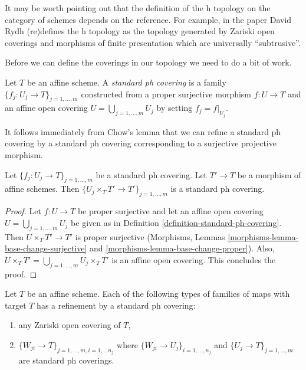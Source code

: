 \medskip\noindent
It may be worth pointing out that the definition of the h topology
on the category of schemes depends on the reference.
For example, in the paper \cite{rydh_descent} David Rydh (re)defines the
h topology as the topology generated by Zariski open coverings
and morphisms of finite presentation which are universally ``subtrusive''.

\medskip\noindent
Before we can define the coverings in our topology we need to do
a bit of work.

\begin{definition}
\label{definition-standard-ph-covering}
Let $T$ be an affine scheme. A {\it standard ph covering} is a family
$\{f_j : U_j \to T\}_{j = 1, \ldots, m}$ constructed from a
proper surjective morphism $f : U \to T$ and an affine open covering
$U = \bigcup_{j = 1, \ldots, m} U_j$ by setting $f_j = f|_{U_j}$.
\end{definition}

\noindent
It follows immediately from Chow's lemma that we can refine a
standard ph covering by a standard ph covering corresponding to
a surjective projective morphism.

\begin{lemma}
\label{lemma-base-change-standard-ph}
Let $\{f_j : U_j \to T\}_{j = 1, \ldots, m}$ be a standard ph covering.
Let $T' \to T$ be a morphism of affine schemes.
Then $\{U_j \times_T T' \to T'\}_{j = 1, \ldots, m}$ is a
standard ph covering.
\end{lemma}

\begin{proof}
Let $f : U \to T$ be proper surjective and let an affine open covering
$U = \bigcup_{j = 1, \ldots, m} U_j$ be given as in
Definition \ref{definition-standard-ph-covering}.
Then $U \times_T T' \to T'$ is proper surjective
(Morphisms, Lemmas \ref{morphisms-lemma-base-change-surjective} and
\ref{morphisms-lemma-base-change-proper}).
Also, $U \times_T T' = \bigcup_{j = 1, \ldots, m} U_j \times_T T'$
is an affine open covering.
This concludes the proof.
\end{proof}

\begin{lemma}
\label{lemma-refine-by-standard-ph}
Let $T$ be an affine scheme. Each of the following types of families
of maps with target $T$ has a refinement by a standard ph covering:
\begin{enumerate}
\item any Zariski open covering of $T$,
\item $\{W_{ji} \to T\}_{j = 1, \ldots, m, i = 1, \ldots n_j}$
where $\{W_{ji} \to U_j\}_{i = 1, \ldots, n_j}$
and $\{U_j \to T\}_{j = 1, \ldots, m}$ are standard ph coverings.
\end{enumerate}
\end{lemma}

